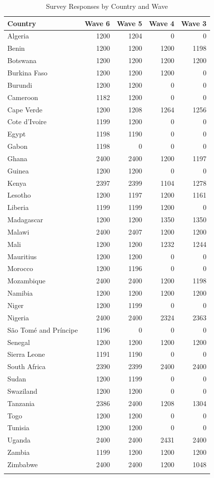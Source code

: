 \documentclass[12pt,]{book}
\theoremstyle{definition}
\theoremstyle{definition}
\theoremstyle{definition}
\theoremstyle{remark}
\begin{document}
\begin{longtable}{lrrrr}
  \hline
Country & Wave 6 & Wave 5 & Wave 4 & Wave 3 \\ 
  \hline
Algeria & 1200 & 1204 &   0 &   0 \\ 
  Benin & 1200 & 1200 & 1200 & 1198 \\ 
  Botswana & 1200 & 1200 & 1200 & 1200 \\ 
  Burkina Faso & 1200 & 1200 & 1200 &   0 \\ 
  Burundi & 1200 & 1200 &   0 &   0 \\ 
  Cameroon & 1182 & 1200 &   0 &   0 \\ 
  Cape Verde & 1200 & 1208 & 1264 & 1256 \\ 
  Cote d'Ivoire & 1199 & 1200 &   0 &   0 \\ 
  Egypt & 1198 & 1190 &   0 &   0 \\ 
  Gabon & 1198 &   0 &   0 &   0 \\ 
  Ghana & 2400 & 2400 & 1200 & 1197 \\ 
  Guinea & 1200 & 1200 &   0 &   0 \\ 
  Kenya & 2397 & 2399 & 1104 & 1278 \\ 
  Lesotho & 1200 & 1197 & 1200 & 1161 \\ 
  Liberia & 1199 & 1199 & 1200 &   0 \\ 
  Madagascar & 1200 & 1200 & 1350 & 1350 \\ 
  Malawi & 2400 & 2407 & 1200 & 1200 \\ 
  Mali & 1200 & 1200 & 1232 & 1244 \\ 
  Mauritius & 1200 & 1200 &   0 &   0 \\ 
  Morocco & 1200 & 1196 &   0 &   0 \\ 
  Mozambique & 2400 & 2400 & 1200 & 1198 \\ 
  Namibia & 1200 & 1200 & 1200 & 1200 \\ 
  Niger & 1200 & 1199 &   0 &   0 \\ 
  Nigeria & 2400 & 2400 & 2324 & 2363 \\ 
  São Tomé and Príncipe & 1196 &   0 &   0 &   0 \\ 
  Senegal & 1200 & 1200 & 1200 & 1200 \\ 
  Sierra Leone & 1191 & 1190 &   0 &   0 \\ 
  South Africa & 2390 & 2399 & 2400 & 2400 \\ 
  Sudan & 1200 & 1199 &   0 &   0 \\ 
  Swaziland & 1200 & 1200 &   0 &   0 \\ 
  Tanzania & 2386 & 2400 & 1208 & 1304 \\ 
  Togo & 1200 & 1200 &   0 &   0 \\ 
  Tunisia & 1200 & 1200 &   0 &   0 \\ 
  Uganda & 2400 & 2400 & 2431 & 2400 \\ 
  Zambia & 1199 & 1200 & 1200 & 1200 \\ 
  Zimbabwe & 2400 & 2400 & 1200 & 1048 \\ 
   \hline
\hline
\caption{Survey Responses by Country and Wave} 
\label{tab:response}
\end{longtable}\doublespacing
\end{document}
